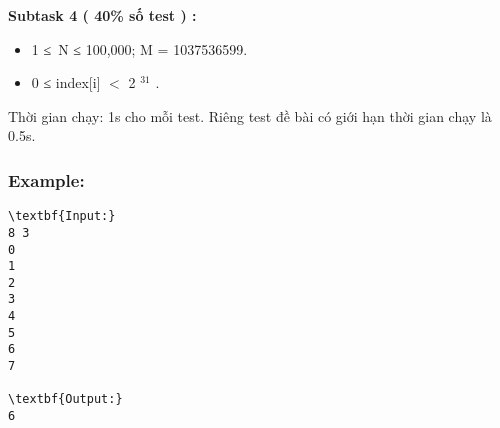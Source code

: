 \textbf{Subtask 4 ( 40\% số test ) : }
\begin{itemize}
	\item 

1 ≤ N ≤ 100,000; M = 1037536599.
	\item 

0 ≤ index[i] $<$ 2 $^ 31 $ .
\end{itemize}

Thời gian chạy: 1s cho mỗi test. Riêng test đề bài có giới hạn thời gian chạy là 0.5s.

\subsubsection{Example:}
\begin{verbatim}
\textbf{Input:}
8 3
0
1
2
3
4
5
6
7

\textbf{Output:}
6
\end{verbatim}